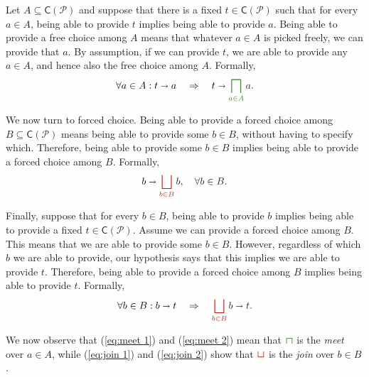 \documentclass[12pt]{article}
\theoremstyle{definition}
\theoremstyle{plain}
\theoremstyle{plain}
\theoremstyle{plain}
\theoremstyle{plain}
\theoremstyle{remark}
\theoremstyle{remark}
\newcommand{\mc}[1]{\mathcal{#1}}
\newcommand{\sub}{\subseteq}
\newcommand{\cbigsqcap}[1]{\color{OliveGreen}\bigsqcap_{#1}\color{Black}}
\newcommand{\csqcap}{\color{OliveGreen}\bm{\sqcap}\color{Black}}
\newcommand{\cbigsqcup}[1]{\color{BrickRed}\bigsqcup_{#1}\color{Black}}
\newcommand{\csqcup}{\color{BrickRed}\bm{\sqcup}\color{Black}}
\begin{document}
Let $A \sub \mathsf{C}(\mc{P})$ and suppose that there is a fixed $t \in \mathsf{C}(\mc{P})$ such that for every $a \in A$, being able to provide $t$ implies being able to provide $a$. Being able to provide a free choice among $A$ means that whatever $a \in A$ is picked freely, we can provide that $a$. By assumption, if we can provide $t$, we are able to provide any $a \in A$, and hence also the free choice among $A$. Formally,
\begin{equation}\label{eq:meet 2}
	\forall a \in A : t \shortrightarrow a  \quad \Rightarrow \quad t \shortrightarrow 	\cbigsqcap{a \in A} a.
\end{equation}

We now turn to forced choice. Being able to provide a forced choice among $B \sub \mathsf{C}(\mc{P})$ means being able to provide some $b \in B$, without having to specify which. Therefore, being able to provide some $b \in B$ implies being able to provide a forced choice among $B$. Formally,
\begin{equation}\label{eq:join 1}
b \shortrightarrow \cbigsqcup{b \in B} b, \quad \forall b \in B.
\end{equation}

Finally, suppose that for every $b \in B$, being able to provide $b$ implies being able to provide a fixed $t \in \mathsf{C}(\mc{P})$. Assume we can provide a forced choice among $B$. This means that we are able to provide some $b \in B$. However, regardless of which $b$ we are able to provide, our hypothesis says that this implies we are able to provide $t$. Therefore, being able to provide a forced choice among $B$ implies being able to provide $t$. Formally, 
\begin{equation}\label{eq:join 2}
\forall b \in B : b \shortrightarrow t  \quad \Rightarrow \quad  \cbigsqcup{b \in B} b \shortrightarrow t.
\end{equation}


We now observe that (\ref{eq:meet 1}) and (\ref{eq:meet 2}) mean that $\csqcap$ is the \emph{meet} over $a \in A$, while (\ref{eq:join 1}) and (\ref{eq:join 2}) show that $\csqcup$ is the \emph{join} over $b \in B$.
\end{document}
